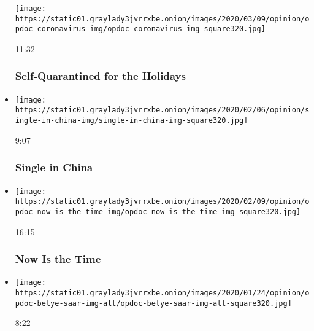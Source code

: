 \begin{itemize}
  \texttt{[image: https://static01.graylady3jvrrxbe.onion/images/2020/03/09/opinion/opdoc-coronavirus-img/opdoc-coronavirus-img-square320.jpg]}

  11:32

  \hypertarget{self-quarantined-for-the-holidays}{%
  \subsubsection{Self-Quarantined for the
  Holidays}\label{self-quarantined-for-the-holidays}}
\item
  \href{https://www.nytimes3xbfgragh.onion/video/opinion/100000006948977/single-in-china.html?action=click\&module=video-series-bar\&region=header\&pgtype=Article\&playlistId=video/op-docs}{}

  \texttt{[image: https://static01.graylady3jvrrxbe.onion/images/2020/02/06/opinion/single-in-china-img/single-in-china-img-square320.jpg]}

  9:07

  \hypertarget{single-in-china}{%
  \subsubsection{Single in China}\label{single-in-china}}
\item
  \href{https://www.nytimes3xbfgragh.onion/video/opinion/100000006946174/now-is-the-time.html?action=click\&module=video-series-bar\&region=header\&pgtype=Article\&playlistId=video/op-docs}{}

  \texttt{[image: https://static01.graylady3jvrrxbe.onion/images/2020/02/09/opinion/opdoc-now-is-the-time-img/opdoc-now-is-the-time-img-square320.jpg]}

  16:15

  \hypertarget{now-is-the-time}{%
  \subsubsection{Now Is the Time}\label{now-is-the-time}}
\item
  \href{https://www.nytimes3xbfgragh.onion/video/opinion/100000006923399/betye-saar-taking-care-of-business.html?action=click\&module=video-series-bar\&region=header\&pgtype=Article\&playlistId=video/op-docs}{}

  \texttt{[image: https://static01.graylady3jvrrxbe.onion/images/2020/01/24/opinion/opdoc-betye-saar-img-alt/opdoc-betye-saar-img-alt-square320.jpg]}

  8:22


\end{itemize}
